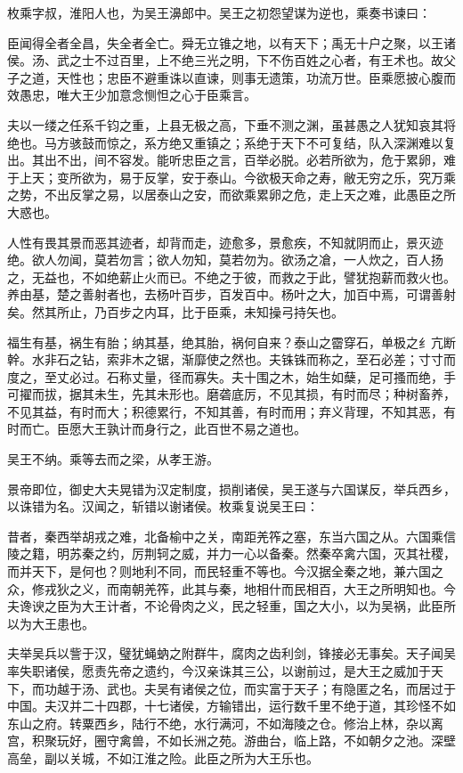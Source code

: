 \documentclass[]{article}
\begin{document}
枚乘字叔，淮阳人也，为吴王濞郎中。吴王之初怨望谋为逆也，乘奏书谏曰：

臣闻得全者全昌，失全者全亡。舜无立锥之地，以有天下；禹无十户之聚，以王诸侯。汤、武之士不过百里，上不绝三光之明，下不伤百姓之心者，有王术也。故父子之道，天性也；忠臣不避重诛以直谏，则事无遗策，功流万世。臣乘愿披心腹而效愚忠，唯大王少加意念恻怛之心于臣乘言。

夫以一缕之任系千钧之重，上县无极之高，下垂不测之渊，虽甚愚之人犹知哀其将绝也。马方骇鼓而惊之，系方绝又重镇之；系绝于天下不可复结，队入深渊难以复出。其出不出，间不容发。能听忠臣之言，百举必脱。必若所欲为，危于累卵，难于上天；变所欲为，易于反掌，安于泰山。今欲极天命之寿，敝无穷之乐，究万乘之势，不出反掌之易，以居泰山之安，而欲乘累卵之危，走上天之难，此愚臣之所大惑也。

人性有畏其景而恶其迹者，却背而走，迹愈多，景愈疾，不知就阴而止，景灭迹绝。欲人勿闻，莫若勿言；欲人勿知，莫若勿为。欲汤之凔，一人炊之，百人扬之，无益也，不如绝薪止火而已。不绝之于彼，而救之于此，譬犹抱薪而救火也。养由基，楚之善射者也，去杨叶百步，百发百中。杨叶之大，加百中焉，可谓善射矣。然其所止，乃百步之内耳，比于臣乘，未知操弓持矢也。

福生有基，祸生有胎；纳其基，绝其胎，祸何自来？泰山之霤穿石，单极之纟亢断幹。水非石之钻，索非木之锯，渐靡使之然也。夫铢铢而称之，至石必差；寸寸而度之，至丈必过。石称丈量，径而寡失。夫十围之木，始生如蘖，足可搔而绝，手可擢而拔，据其未生，先其未形也。磨砻底厉，不见其损，有时而尽；种树畜养，不见其益，有时而大；积德累行，不知其善，有时而用；弃义背理，不知其恶，有时而亡。臣愿大王孰计而身行之，此百世不易之道也。

吴王不纳。乘等去而之梁，从孝王游。

景帝即位，御史大夫晃错为汉定制度，损削诸侯，吴王遂与六国谋反，举兵西乡，以诛错为名。汉闻之，斩错以谢诸侯。枚乘复说吴王曰：

昔者，秦西举胡戎之难，北备榆中之关，南距羌筰之塞，东当六国之从。六国乘信陵之籍，明苏秦之约，厉荆轲之威，并力一心以备秦。然秦卒禽六国，灭其社稷，而并天下，是何也？则地利不同，而民轻重不等也。今汉据全秦之地，兼六国之众，修戎狄之义，而南朝羌筰，此其与秦，地相什而民相百，大王之所明知也。今夫谗谀之臣为大王计者，不论骨肉之义，民之轻重，国之大小，以为吴祸，此臣所以为大王患也。

夫举吴兵以訾于汉，璧犹蝇蚋之附群牛，腐肉之齿利剑，锋接必无事矣。天子闻吴率失职诸侯，愿责先帝之遗约，今汉亲诛其三公，以谢前过，是大王之威加于天下，而功越于汤、武也。夫吴有诸侯之位，而实富于天子；有隐匿之名，而居过于中国。夫汉并二十四郡，十七诸侯，方输错出，运行数千里不绝于道，其珍怪不如东山之府。转粟西乡，陆行不绝，水行满河，不如海陵之仓。修治上林，杂以离宫，积聚玩好，圈守禽兽，不如长洲之苑。游曲台，临上路，不如朝夕之池。深壁高垒，副以关城，不如江淮之险。此臣之所为大王乐也。
\end{document}

